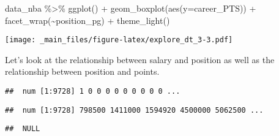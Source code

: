 \documentclass[
]{book}
\newenvironment{Shaded}{\begin{snugshade}}{\end{snugshade}}
\newcommand{\AttributeTok}[1]{\textcolor[rgb]{0.77,0.63,0.00}{#1}}
\newcommand{\AttributeTok}[1]{\textcolor[rgb]{0.13,0.29,0.53}{#1}}
\newcommand{\FunctionTok}[1]{\textcolor[rgb]{0.00,0.00,0.00}{#1}}
\newcommand{\FunctionTok}[1]{\textcolor[rgb]{0.13,0.29,0.53}{\textbf{#1}}}
\newcommand{\NormalTok}[1]{#1}
\newcommand{\SpecialCharTok}[1]{\textcolor[rgb]{0.00,0.00,0.00}{#1}}
\newcommand{\SpecialCharTok}[1]{\textcolor[rgb]{0.81,0.36,0.00}{\textbf{#1}}}
\begin{document}
\begin{Shaded}
\begin{Highlighting}[]
\NormalTok{data\_nba }\SpecialCharTok{\%\textgreater{}\%} \FunctionTok{ggplot}\NormalTok{() }\SpecialCharTok{+} 
\FunctionTok{geom\_boxplot}\NormalTok{(}\FunctionTok{aes}\NormalTok{(}\AttributeTok{y=}\NormalTok{career\_PTS)) }\SpecialCharTok{+}
  \FunctionTok{facet\_wrap}\NormalTok{(}\SpecialCharTok{\textasciitilde{}}\NormalTok{position\_pg) }\SpecialCharTok{+}
  \FunctionTok{theme\_light}\NormalTok{()}
\end{Highlighting}
\end{Shaded}

\texttt{[image: \_main\_files/figure-latex/explore\_dt\_3-3.pdf]}

Let's look at the relationship between salary and position as well as the
relationship between position and points.

\begin{Shaded}
\end{Shaded}

\begin{verbatim}
##  num [1:9728] 1 0 0 0 0 0 0 0 0 0 ...
\end{verbatim}

\begin{Shaded}
\end{Shaded}

\begin{verbatim}
##  num [1:9728] 798500 1411000 1594920 4500000 5062500 ...
\end{verbatim}

\begin{Shaded}
\end{Shaded}

\begin{verbatim}
##  NULL
\end{verbatim}
\end{document}

